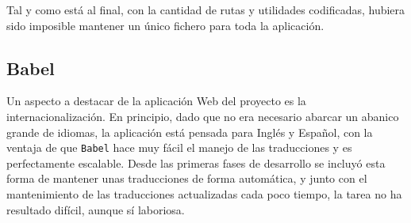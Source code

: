 Tal y como está al final, con la cantidad de rutas y utilidades codificadas,
hubiera sido imposible mantener un único fichero para toda la aplicación.

\subsection{Babel}

Un aspecto a destacar de la aplicación Web del proyecto es la
internacionalización. En principio, dado que no era necesario abarcar un abanico
grande de idiomas, la aplicación está pensada para Inglés y Español, con la
ventaja de que \texttt{Babel} hace muy fácil el manejo de las traducciones y es
perfectamente escalable. Desde las primeras fases de desarrollo se incluyó esta
forma de mantener unas traducciones de forma automática, y junto con el
mantenimiento de las traducciones actualizadas cada poco tiempo, la tarea no ha
resultado difícil, aunque sí laboriosa.